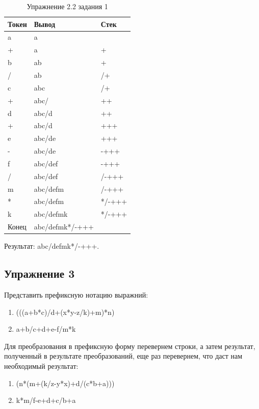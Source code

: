 \documentclass[a4paper, 14pt]{extarticle}
\begin{document}
\begin{longtable}[htpb]{|p{3cm}|p{5cm}|p{3cm}|}
  \caption{Упражнение 2.2 задания 1}
  \label{tab:second2_ex}
  \\
    \hline
    Токен & Вывод & Стек
    \\ \hline
    a & a & 
    \\ \hline
    + & a & +
    \\ \hline
    b & ab & +
    \\ \hline
    / & ab & /+
    \\ \hline
    c & abc & /+
    \\ \hline
    + & abc/ & ++
    \\ \hline
    d & abc/d & ++
    \\ \hline
    + & abc/d & +++
    \\ \hline
    e & abc/de & +++
    \\ \hline
    - & abc/de & -+++
    \\ \hline
    f & abc/def & -+++
    \\ \hline
    / & abc/def & /-+++
    \\ \hline
    m & abc/defm & /-+++
    \\ \hline
    * & abc/defm & */-+++
    \\ \hline
    k & abc/defmk & */-+++
    \\ \hline
    Конец & abc/defmk*/-+++ &
    \\ \hline
    \end{longtable}
Результат: abc/defmk*/-+++.
\subsection{Упражнение 3}
Представить префиксную нотацию выражний:
\begin{enumerate}
  \item (((a+b*c)/d+(x*y-z/k)+m)*n)
  \item a+b/c+d+e-f/m*k
\end{enumerate}
Для преобразования в префиксную форму перевернем строки,
а затем результат, полученный в результате преобразований,
еще раз перевернем, что даст нам необходимый результат:
\begin{enumerate}
  \item (n*(m+(k/z-y*x)+d/(c*b+a)))
  \item k*m/f-e+d+c/b+a
\end{enumerate}
\end{document}
